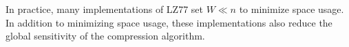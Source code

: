 In practice, many implementations of LZ77 set $W \ll n$ to minimize space usage. In addition to minimizing space usage, these implementations also reduce the global sensitivity of the compression algorithm.   














